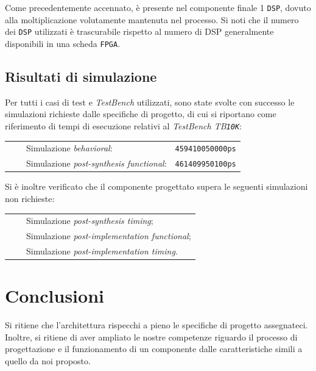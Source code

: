\documentclass{article}
\newcommand{\tabitem}{~~\llap{\textbullet}~~}
\begin{document}
Come precedentemente accennato, è presente nel componente finale 1 \texttt{DSP}, dovuto alla moltiplicazione volutamente mantenuta nel processo. Si noti che il numero dei \texttt{DSP} utilizzati è trascurabile rispetto al numero di DSP generalmente disponibili in una scheda \texttt{FPGA}.
\vspace{0,2cm}

\subsection{Risultati di simulazione}
Per tutti i casi di test e \emph{TestBench} utilizzati, sono state svolte con successo le simulazioni richieste dalle specifiche di progetto, di cui si riportano come riferimento di tempi di esecuzione relativi al \emph{TestBench TB\texttt{10K}}:\par
\def\arraystretch{1.3} %
\begin{tabular}{m{8cm} m{3cm}}
    \tabitem Simulazione \emph{behavioral}:                & \texttt{459410050000ps} \\
    \tabitem Simulazione \emph{post-synthesis functional}: & \texttt{461409950100ps} \\
\end{tabular}\vspace{0,2cm}

Si è inoltre verificato che il componente progettato supera le seguenti simulazioni non richieste:\par
\def\arraystretch{1.3} %
\begin{tabular}{m{8cm}}
    \tabitem Simulazione \emph{post-synthesis timing};          \\
    \tabitem Simulazione \emph{post-implementation functional}; \\
    \tabitem Simulazione \emph{post-implementation timing}.     \\
\end{tabular}\vspace{1cm}

\section{Conclusioni}
Si ritiene che l’architettura rispecchi a pieno le specifiche di progetto assegnateci. Inoltre, si ritiene di aver ampliato le nostre competenze riguardo il processo di progettazione e il funzionamento di un componente dalle caratteristiche simili a quello da noi proposto.
\end{document}
